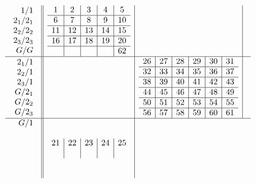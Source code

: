 \documentclass{amsart}
\begin{document}
\begin{align*}
  \begin{array}{r||c|c|c}
    \begin{array}{r}
      1/1 \\ 2_1/2_1 \\ 2_2/2_2 \\ 2_3/2_3 \\ G/G \\
    \end{array}
&
\begin{array}{c|c|c|c|c}
1 & 2 & 3 & 4 & 5 \\ \hline
6 & 7 & 8 & 9 & 10 \\\hline
11 & 12 & 13 & 14 & 15 \\\hline
16 & 17 & 18 & 19 & 20 \\\hline
   &  &  &  & 62 \\
\end{array}
&& \\ \hline
    \begin{array}{r}
      2_1/1 \\ 2_2/1 \\ 2_3/1 \\ G/2_1 \\ G/2_2 \\ G/2_3 \\
    \end{array}
&&
  \begin{array}{c|c|c|c|c|c}
26 & 27 & 28 & 29 & 30 & 31 \\\hline
32 & 33 & 34 & 35 & 36 & 37 \\\hline
38 & 39 & 40 & 41 & 42 & 43 \\\hline
44 & 45 & 46 & 47 & 48 & 49 \\\hline
50 & 51 & 52 & 53 & 54 & 55 \\\hline
56 & 57 & 58 & 59 & 60 & 61 \\
  \end{array}
& \\ \hline
    \begin{array}{r}
      G/1 \\ \\ \\ \\ \\ \\
    \end{array}
&
\begin{array}{c|c|c|c|c}
21 & 22 & 23 & 24 & 25 \\
 &  &  &  &  \\

\end{array}
\end{array}
\end{align*}
\end{document}
